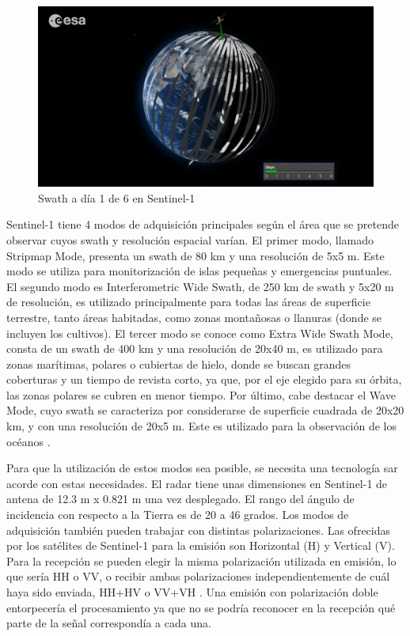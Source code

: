 \\
\begin{figure}[h]
    \centering
    \includegraphics[width=.9\linewidth]{archivos/tfg/swathS1} %
    \caption{Swath a día 1 de 6 en Sentinel-1 \cite{ESAcons}}
    \label{fig:swath}
\end{figure}
\par Sentinel-1 tiene 4 modos de adquisición principales según el área que se pretende observar cuyos swath y resolución espacial varían. El primer modo, llamado Stripmap Mode, presenta un swath de 80 km y una resolución de 5x5 m. Este modo se utiliza para monitorización de islas pequeñas y emergencias puntuales. El segundo modo es Interferometric Wide Swath, de 250 km de swath y 5x20 m de resolución, es utilizado principalmente para todas las áreas de superficie terrestre, tanto áreas habitadas, como zonas montañosas o llanuras (donde se incluyen los cultivos). El tercer modo se conoce como Extra Wide Swath Mode, consta de un swath de 400 km y una resolución de 20x40 m, es utilizado para zonas marítimas, polares o cubiertas de hielo, donde se buscan grandes coberturas y un tiempo de revista corto, ya que, por el eje elegido para su órbita, las zonas polares se cubren en menor tiempo. Por último, cabe destacar el Wave Mode, cuyo swath se caracteriza por considerarse de superficie cuadrada de 20x20 km, y con una resolución de 20x5 m. Este es utilizado para la observación de los océanos \cite{EOSs1}. 
\\
\par Para que la utilización de estos modos sea posible, se necesita una tecnología \gls{sar} acorde con estas necesidades. El radar tiene unas dimensiones en Sentinel-1 de antena de 12.3 m x 0.821 m una vez desplegado. El rango del ángulo de incidencia con respecto a la Tierra es de 20 a 46 grados. Los modos de adquisición también pueden trabajar con distintas polarizaciones. Las ofrecidas por los satélites de Sentinel-1 para la emisión son Horizontal (H) y Vertical (V). Para la recepción se pueden elegir la misma polarización utilizada en emisión, lo que sería HH o VV, o recibir ambas polarizaciones independientemente de cuál haya sido enviada, HH+HV o VV+VH \cite{EOSs1}. Una emisión con polarización doble entorpecería el procesamiento ya que no se podría reconocer en la recepción qué parte de la señal correspondía a cada una. 


